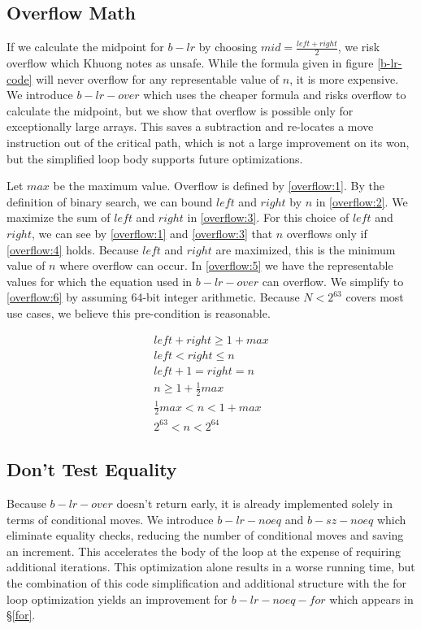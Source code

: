 \documentclass[twocolumn]{article}
\begin{document}
\subsection{Overflow Math}
\label{overflow}
If we calculate the midpoint for $b-lr$ by choosing $mid = \frac{left+right}{2}$, we risk overflow which Khuong notes as unsafe. \cite{pvk-search-retro} While the formula given in figure \ref{b-lr-code} will never overflow for any representable value of $n$, it is more expensive. We introduce $b-lr-over$ which uses the cheaper formula and risks overflow to calculate the midpoint, but we show that overflow is possible only for exceptionally large arrays. This saves a subtraction and re-locates a move instruction out of the critical path, which is not a large improvement on its won, but the simplified loop body supports future optimizations.

Let $max$ be the maximum value. Overflow is defined by \eqref{overflow:1}. By the definition of binary search, we can bound $left$ and $right$ by $n$ in \eqref{overflow:2}. We maximize the sum of $left$ and $right$ in \eqref{overflow:3}. For this choice of $left$ and $right$, we can see by \eqref{overflow:1} and \eqref{overflow:3} that $n$ overflows only if \eqref{overflow:4} holds. Because $left$ and $right$ are maximized, this is the minimum value of $n$ where overflow can occur. In \eqref{overflow:5} we have the representable values for which the equation used in $b-lr-over$ can overflow. We simplify to \eqref{overflow:6} by assuming 64-bit integer arithmetic. Because $N < 2^{63}$ covers most use cases, we believe this pre-condition is reasonable.

\begin{align}
left + right \geq 1 + max \label{overflow:1}
\\ left < right \leq n \label{overflow:2}
\\ left + 1 = right = n \label{overflow:3}
\\ n \geq 1 + \frac{1}{2}max \label{overflow:4}
\\ \frac{1}{2}max < n < 1 + max \label{overflow:5}
\\ 2^{63} < n < 2^{64} \label{overflow:6}
\end{align}

\subsection{Don't Test Equality}
\label{noeq}
Because $b-lr-over$ doesn't return early, it is already implemented solely in terms of conditional moves. We introduce $b-lr-noeq$ and $b-sz-noeq$ which eliminate equality checks, reducing the number of conditional moves and saving an increment. This accelerates the body of the loop at the expense of requiring additional iterations. This optimization alone results in a worse running time, but the combination of this code simplification and additional structure with the for loop optimization yields an improvement for $b-lr-noeq-for$ which appears in \S\ref{for}.
\end{document}
